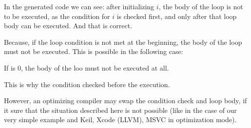 





In the generated code we can see: 
after initializing $i$, the body of the loop is not to be executed,
as the condition for $i$ is checked first, and only after that loop body can be executed.
And that is correct. 

Because, if the loop condition is
not met at the beginning, the body of the loop must not be executed.
This is possible in the following case:



If  is 0, the body of the loo must not be executed at all.

This is why the condition checked before the execution.

However, an optimizing compiler may swap the condition check and loop body,
if it sure that the situation described here is
not possible (like in the case of our very simple example and Keil, Xcode (LLVM), MSVC in optimization mode).
